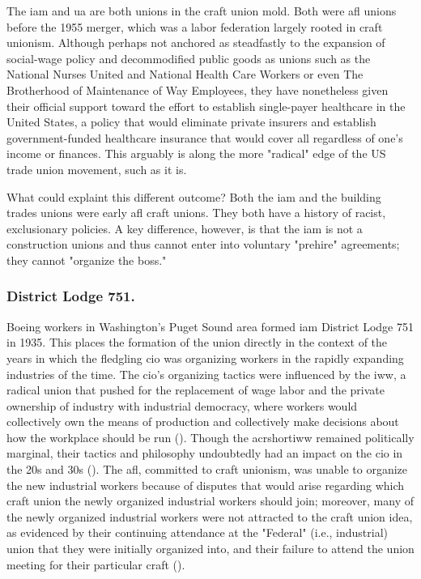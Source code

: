 \documentclass[12pt]{article}
\begin{document}
The \acrfull{iam} and \acrshort{ua} are both unions in the craft union mold. Both were \acrfull{afl} unions before the 1955 merger, which was a labor federation largely rooted in craft unionism. Although perhaps not anchored as steadfastly to the expansion of social-wage policy and decommodified public goods as unions such as the National Nurses United and National Health Care Workers or even The Brotherhood of Maintenance of Way Employees, they have nonetheless given their official support toward the effort to establish single-payer healthcare in the United States, a policy that would eliminate private insurers and establish government-funded healthcare insurance that would cover all regardless of one's income or finances. This arguably is along the more "radical" edge of the US trade union movement, such as it is.

What could explaint this different outcome? Both the \acrshort{iam} and the building trades unions were early \acrshort{afl} craft unions. They both have a history of racist, exclusionary policies. A key difference, however, is that the \acrshort{iam} is not a construction unions and thus cannot enter into voluntary "prehire" agreements; they cannot "organize the boss."

\subsubsection{District Lodge 751.}
Boeing workers in Washington's Puget Sound area formed \acrshort{iam} District Lodge 751 in 1935. This places the formation of the union directly in the context of the years in which the fledgling \acrshort{cio} was organizing workers in the rapidly expanding industries of the time. The \acrshort{cio}'s organizing tactics were influenced by the \acrfull{iww}, a radical union that pushed for the replacement of wage labor and the private ownership of industry with industrial democracy, where workers would collectively own the means of production and collectively make decisions about how the workplace should be run (\cite{industrialworkersoftheworldIWW}). Though the acrshort{iww} remained politically marginal, their tactics and philosophy undoubtedly had an impact on the \acrshort{cio} in the 20s and 30s (\cite[2-6]{mccannBloodWaterHistory1989}). The \acrshort{afl}, committed to craft unionism, was unable to organize the new industrial workers because of disputes that would arise regarding which craft union the newly organized industrial workers should join; moreover, many of the newly organized industrial workers were not attracted to the craft union idea, as evidenced by their continuing attendance at the "Federal" (i.e., industrial) union that they were initially organized into, and their failure to attend the union meeting for their particular craft (\cite[8]{mccannBloodWaterHistory1989}). 
\end{document}
